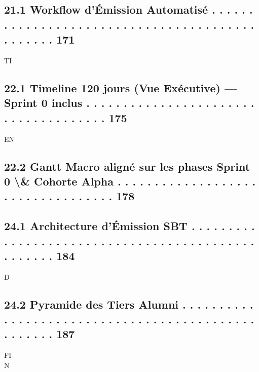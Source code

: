 \subsection{21.1 Workflow d’Émission Automatisé      . . . . . . . . . . . . . . . . . . . . . . . . . . . . . . . . . . . . . . . . . . . . . . . 171}
\vspace{0.5em}
\vspace{0.5em}
\vspace{0.5em}
\vspace{0.5em}
TI\\
\subsection{22.1 Timeline 120 jours (Vue Exécutive) — Sprint 0 inclus . . . . . . . . . . . . . . . . . . . . . . . . . . . . . . . . . . . . . 175}
\vspace{0.5em}
\vspace{0.5em}
\vspace{0.5em}
\vspace{0.5em}
EN\\
\subsection{22.2 Gantt Macro aligné sur les phases Sprint 0 \textbackslash{}& Cohorte Alpha . . . . . . . . . . . . . . . . . . . . . . . . . . . . . . . . . . 178}
\vspace{0.5em}
\subsection{24.1 Architecture d’Émission SBT . . . . . . . . . . . . . . . . . . . . . . . . . . . . . . . . . . . . . . . . . . . . . . . . . . 184}
\vspace{0.5em}
\vspace{0.5em}
\vspace{0.5em}
\vspace{0.5em}
D\\
\subsection{24.2 Pyramide des Tiers Alumni . . . . . . . . . . . . . . . . . . . . . . . . . . . . . . . . . . . . . . . . . . . . . . . . . . . 187}
\vspace{0.5em}
\vspace{0.5em}
\vspace{0.5em}
\vspace{0.5em}
FI\\
N\\
